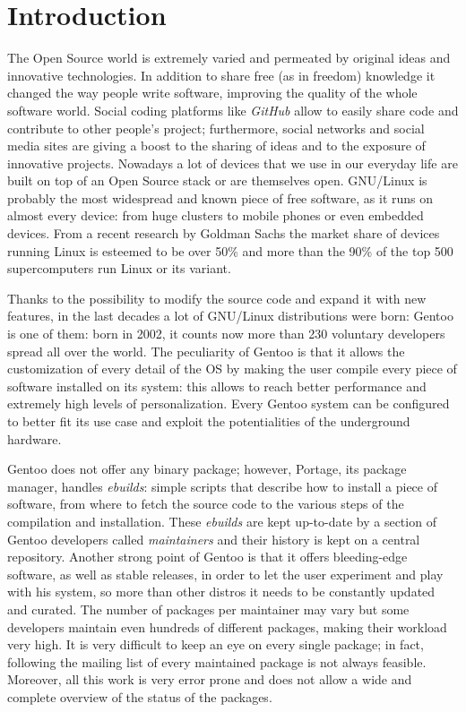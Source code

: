 \chapter{Introduction}

The Open Source world is extremely varied and permeated by original ideas and innovative technologies. In addition to share free (as in freedom) knowledge it changed the way people write software, improving the quality of the whole software world.
Social coding platforms like \emph{GitHub} allow to easily share code and contribute to other people's project; furthermore, social networks and social media sites are giving a boost to the sharing of ideas and to the exposure of innovative projects.
Nowadays a lot of devices that we use in our everyday life are built on top of an Open Source stack or are themselves open. GNU/Linux is probably the most widespread and known piece of free software, as it runs on almost every device: from huge clusters to mobile phones or even embedded devices. From a recent research by Goldman Sachs the market share of devices running Linux is esteemed to be over 50\%\cite{goldmansachs_microsoft} and more than the 90\% of the top 500 supercomputers run Linux or its variant\cite{top500}.

Thanks to the possibility to modify the source code and expand it with new features, in the last decades a lot of GNU/Linux distributions were born: Gentoo is one of them: born in 2002, it counts now more than 230 voluntary developers spread all over the world. The peculiarity of Gentoo is that it allows the customization of every detail of the OS by making the user compile every piece of software installed on its system: this allows to reach better performance and extremely high levels of personalization. Every Gentoo system can be configured to better fit its use case and exploit the potentialities of the underground hardware.

Gentoo does not offer any binary package; however, Portage, its package manager, handles \emph{ebuilds}: simple scripts that describe how to install a piece of software, from where to fetch the source code to the various steps of the compilation and installation. These \emph{ebuilds} are kept up-to-date by a section of Gentoo developers called \emph{maintainers} and their history is kept on a central repository. Another strong point of Gentoo is that it offers bleeding-edge software, as well as stable releases, in order to let the user experiment and play with his system, so more than other distros it needs to be constantly updated and curated.
The number of packages per maintainer may vary but some developers maintain even hundreds of different packages, making their workload very high. It is very difficult to keep an eye on every single package; in fact, following the mailing list of every maintained package is not always feasible. Moreover, all this work is very error prone and does not allow a wide and complete overview of the status of the packages.

